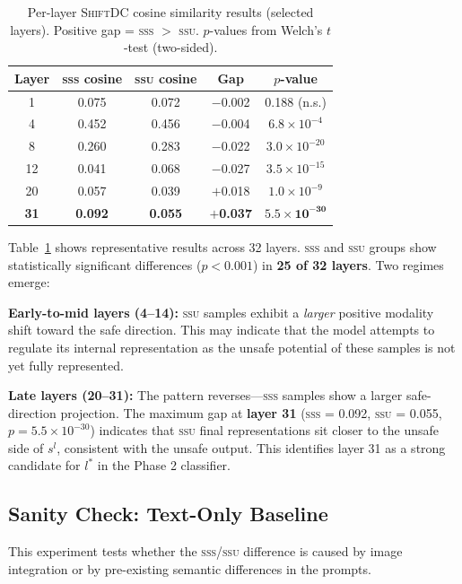 \documentclass{article}
\newcommand{\ShiftDC}{\textsc{ShiftDC}}
\newcommand{\safel}{s^l}
\begin{document}
\begin{table}[t]
  \centering
  \caption{Per-layer \ShiftDC{} cosine similarity results (selected layers).
    Positive gap = \textsc{sss} $>$ \textsc{ssu}.
    $p$-values from Welch's $t$-test (two-sided).}
  \label{tab:shiftdc}
  \begin{tabular}{ccccc}
    \toprule
    Layer & \textsc{sss} cosine & \textsc{ssu} cosine & Gap & $p$-value \\
    \midrule
    1  & 0.075 & 0.072 & $-$0.002 & 0.188 (n.s.) \\
    4  & 0.452 & 0.456 & $-$0.004 & $6.8\times10^{-4}$ \\
    8  & 0.260 & 0.283 & $-$0.022 & $3.0\times10^{-20}$ \\
    12 & 0.041 & 0.068 & $-$0.027 & $3.5\times10^{-15}$ \\
    20 & 0.057 & 0.039 & $+$0.018 & $1.0\times10^{-9}$ \\
    \textbf{31} & \textbf{0.092} & \textbf{0.055} & $+$\textbf{0.037} &
      $\mathbf{5.5\times10^{-30}}$ \\
    \bottomrule
  \end{tabular}
\end{table}

Table~\ref{tab:shiftdc} shows representative results across 32 layers.
\textsc{sss} and \textsc{ssu} groups show statistically significant differences
($p < 0.001$) in \textbf{25 of 32 layers}.
Two regimes emerge:

\textbf{Early-to-mid layers (4--14):} \textsc{ssu} samples exhibit a \emph{larger} positive
modality shift toward the safe direction.
This may indicate that the model attempts to regulate its internal representation as the
unsafe potential of these samples is not yet fully represented.

\textbf{Late layers (20--31):} The pattern reverses---\textsc{sss} samples show a larger
safe-direction projection.
The maximum gap at \textbf{layer 31} (\textsc{sss} = 0.092, \textsc{ssu} = 0.055,
$p = 5.5\times10^{-30}$) indicates that \textsc{ssu} final representations sit closer to
the unsafe side of $\safel$, consistent with the unsafe output.
This identifies layer 31 as a strong candidate for $l^*$ in the Phase 2 classifier.

\subsection{Sanity Check: Text-Only Baseline}

This experiment tests whether the \textsc{sss}/\textsc{ssu} difference is caused by image
integration or by pre-existing semantic differences in the prompts.
\end{document}
